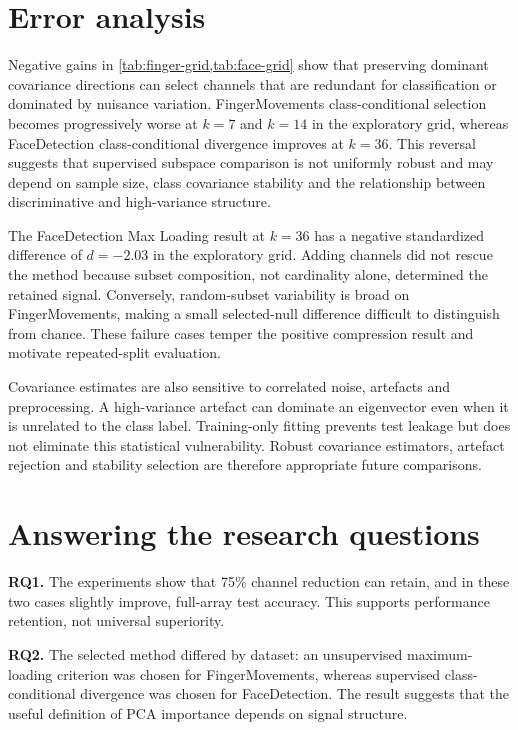 \section{Error analysis}
Negative gains in \cref{tab:finger-grid,tab:face-grid} show that preserving dominant covariance directions can select channels that are redundant for classification or dominated by nuisance variation. FingerMovements class-conditional selection becomes progressively worse at $k=7$ and $k=14$ in the exploratory grid, whereas FaceDetection class-conditional divergence improves at $k=36$. This reversal suggests that supervised subspace comparison is not uniformly robust and may depend on sample size, class covariance stability and the relationship between discriminative and high-variance structure.

The FaceDetection Max Loading result at $k=36$ has a negative standardized difference of $d=-2.03$ in the exploratory grid. Adding channels did not rescue the method because subset composition, not cardinality alone, determined the retained signal. Conversely, random-subset variability is broad on FingerMovements, making a small selected-null difference difficult to distinguish from chance. These failure cases temper the positive compression result and motivate repeated-split evaluation.

Covariance estimates are also sensitive to correlated noise, artefacts and preprocessing. A high-variance artefact can dominate an eigenvector even when it is unrelated to the class label. Training-only fitting prevents test leakage but does not eliminate this statistical vulnerability. Robust covariance estimators, artefact rejection and stability selection are therefore appropriate future comparisons.

\section{Answering the research questions}
\textbf{RQ1.} The experiments show that 75\% channel reduction can retain, and in these two cases slightly improve, full-array test accuracy. This supports performance retention, not universal superiority.

\textbf{RQ2.} The selected method differed by dataset: an unsupervised maximum-loading criterion was chosen for FingerMovements, whereas supervised class-conditional divergence was chosen for FaceDetection. The result suggests that the useful definition of PCA importance depends on signal structure.

